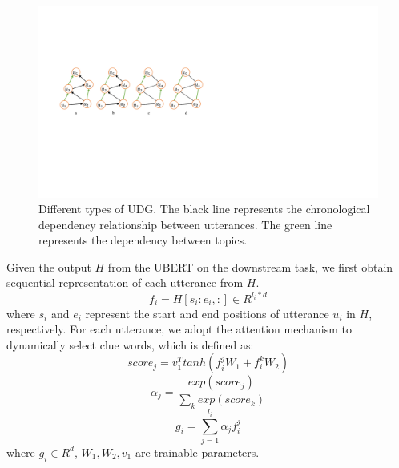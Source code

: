 \documentclass[letterpaper]{article} %
\begin{document}
\begin{figure}[t]
\centering
\includegraphics[width=0.98\columnwidth]{graph}
\caption{Different types of UDG. The black line represents the chronological dependency relationship between utterances. The green line represents the dependency between topics.}
\label{dag}
\end{figure}

Given the output $H$ from the UBERT on the downstream task, we first obtain sequential representation of each utterance from $H$.
\begin{equation}
    f_i=H[s_i:e_i,:] \in R^{l_i * d}
\end{equation}
where $s_i$ and $e_i$ represent the start and end positions of utterance $u_i$ in $H$, respectively. For each utterance, we adopt the attention mechanism to dynamically select clue words, which is defined as:
\begin{equation}
    score_j=v_1^T tanh(f_i^j W_1 + f_i^k W_2)
\end{equation}
\begin{equation}
    \alpha_j=\frac{exp(score_j)}{\sum_k exp(score_k)}
\end{equation}
\begin{equation}
    g_i=\sum_{j=1}^{l_i} \alpha_j f_i^j
\end{equation}
where $g_i \in R^d$, $W_1,W_2,v_1$ are trainable parameters.
\end{document}

